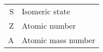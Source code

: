 \begin{tabular}{rl}
    S& Isomeric state\\
    Z& Atomic number\\
    A& Atomic mass number
\end{tabular}